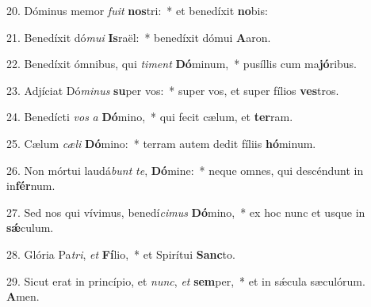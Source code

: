20. Dóminus memor \textit{fu}\textit{it} \textbf{nos}tri:~*  et benedíxit \textbf{no}bis:\

21. Benedíxit dó\textit{mu}\textit{i} \textbf{Is}raël:~*  benedíxit dómui \textbf{A}aron.\

22. Benedíxit ómnibus, qui \textit{ti}\textit{ment} \textbf{Dó}minum,~*  pusíllis cum ma\textbf{jó}ribus.\

23. Adjíciat Dó\textit{mi}\textit{nus} \textbf{su}per vos:~*  super vos, et super fílios \textbf{ves}tros.\

24. Benedícti \textit{vos} \textit{a} \textbf{Dó}mino,~*  qui fecit cælum, et \textbf{ter}ram.\

25. Cælum \textit{cæ}\textit{li} \textbf{Dó}mino:~*  terram autem dedit fíliis \textbf{hó}minum.\

26. Non mórtui laudá\textit{bunt} \textit{te}, \textbf{Dó}mine:~*  neque omnes, qui descéndunt in in\textbf{fér}num.\

27. Sed nos qui vívimus, benedí\textit{ci}\textit{mus} \textbf{Dó}mino,~*  ex hoc nunc et usque in \textbf{sǽ}culum.\

28. Glória Pa\textit{tri}, \textit{et} \textbf{Fí}lio,~*  et Spirítui \textbf{Sanc}to.\

29. Sicut erat in princípio, et \textit{nunc}, \textit{et} \textbf{sem}per,~*  et in sǽcula sæculórum. \textbf{A}men.\

